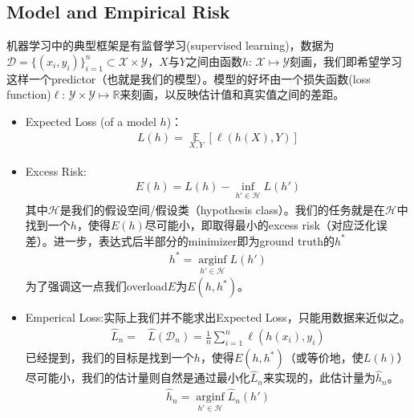 \documentclass[11pt,a4paper]{ctexart}
\numberwithin{equation}{section}%
\begin{document}
\subsection{Model and Empirical Risk}
机器学习中的典型框架是有监督学习(supervised learning)，数据为$\mathcal{D}=\{(x_i,y_i)\}_{i=1}^n\subset \mathcal{X}\times \mathcal{Y}$，$X$与$Y$之间由函数$h:\, \mathcal{X}\mapsto \mathcal{Y}$刻画，我们即希望学习这样一个predictor（也就是我们的模型）。模型的好坏由一个损失函数(loss function)$\ell:\, \mathcal{Y}\times \mathcal{Y}\mapsto \mathbb{R}$来刻画，以反映估计值和真实值之间的差距。
\begin{itemize}[topsep=2pt,itemsep=0pt]
    \item Expected Loss (of a model $h$)：
    \begin{align*}
        L(h) = \mathop{ \mathbb{E} }\limits_{X,Y} \left[ \ell\left( h(X),Y \right) \right] 
    \end{align*}
    \item Excess Risk:
    \begin{align*}
        E(h) = L(h) - \inf_{h'\in \mathcal{H}} L(h') 
    \end{align*}
    其中$\mathcal{H}$是我们的假设空间/假设类（hypothesis class）。我们的任务就是在$\mathcal{H}$中找到一个$h$，使得$E(h)$尽可能小，即取得最小的excess risk（对应泛化误差）。进一步，表达式后半部分的minimizer即为ground truth的$h^*$
    \begin{align*}
        h^*=\mathop{ \arg\inf  }\limits_{h'\in \mathcal{H}} L(h') 
    \end{align*}
     为了强调这一点我们overload$E$为$E(h,h^*)$。

    \item Emperical Loss:实际上我们并不能求出Expected Loss，只能用数据来近似之。
    \begin{align*}
        \hat{L}_n=& \hat{L}(\mathcal{D}_n)=\frac{1}{n} \sum_{i=1}^n \ell\left( h(x_i),y_i \right)
    \end{align*}
    已经提到，我们的目标是找到一个$h$，使得$E(h,h^*)$（或等价地，使$L(h)$）尽可能小，我们的估计量则自然是通过最小化$\hat{L}_n$来实现的，此估计量为$\hat{h}_n$。
    \begin{align*}
        \hat{h}_n=\mathop{ \arg\inf  }\limits_{h'\in \mathcal{H}} \hat{L}_n(h') 
    \end{align*}
    

\end{itemize}
\end{document}
